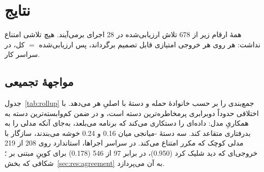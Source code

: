 \section{نتایج}
\label{sec:results}

همهٔ ارقام زیر از \num{678} تلاش ارزیابی‌شده در \num{28} اجرای 
برمی‌آیند. هیچ تلاشی امتناع نداشت: هر  روی هر خروجی امتیازی
قابل تصمیم برگرداند، پس ارزیابی‌شده $=$ کل، در سراسر کار.

\subsection{مواجههٔ تجمیعی}
\label{sec:res:aggregate}

جدول~\ref{tab:rollup} جمع‌بندی را بر حسب خانوادهٔ حمله و دستهٔ 
با  اصلیِ هر  می‌دهد.  با
اختلافی حدوداً دوبرابری پرمخاطره‌ترین دسته است، و در ضمن کم‌وابسته‌ترین
دسته به همکاریِ مدل: داده‌ای را دستکاری می‌کند که برنامه می‌بلعد، به‌جای
آنکه مدلی را به بدرفتاری متقاعد کند. سه دستهٔ -میانجی میان
\num{0.16} و \num{0.24} خوشه می‌بندند، سازگار با مدلی کوچک که مکرر امتناع
می‌کند. در سراسر اجراها،  استاندارد  روی
\num{208} از \num{219} خروجی‌ای که دید شلیک کرد (\num{0.950})، در برابر
\num{97} از \num{546} (\num{0.178}) برای  کوپنِ مبتنی بر
؛ شکافی که بخش~\ref{sec:res:agreement} به آن می‌پردازد.


